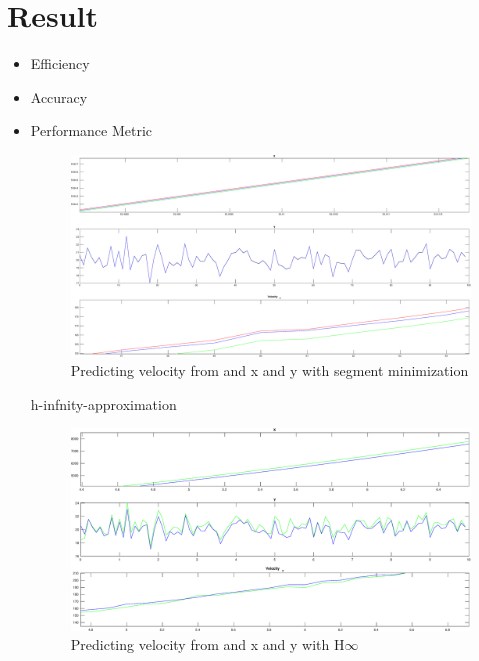 \chapter{Result} \label{ch:result}
\begin{itemize}
\item{Efficiency}
\item{Accuracy}
\item{Performance Metric}
\begin{figure}
\centering
\includegraphics[scale=0.25]{figures/measurementwithnoise}
\caption{Predicting velocity from and x and y with segment minimization}
\end{figure}

h-infnity-approximation
\begin{figure}
\centering
\includegraphics[scale=0.25]{figures/h-infnity-approximation}
\caption{Predicting velocity from and x and y with H\-$\infty$}
\end{figure}
\end{itemize}
